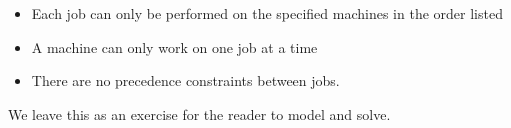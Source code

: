 \begin{itemize}
    \item Each job can only be performed on the specified machines in the order listed
    \item A machine can only work on one job at a time
    \item There are no precedence constraints between jobs.
\end{itemize}
%

We leave this as an exercise for the reader to model and solve.


\iffalse  %
